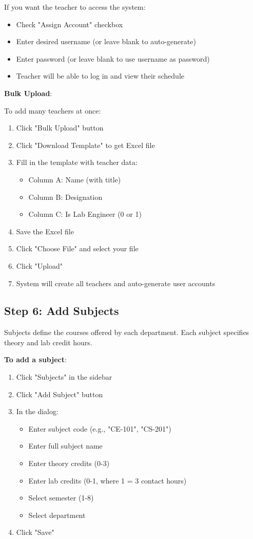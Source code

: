 \documentclass[12pt,a4paper]{article}
\begin{document}
If you want the teacher to access the system:
\begin{itemize}
\item Check "Assign Account" checkbox
\item Enter desired username (or leave blank to auto-generate)
\item Enter password (or leave blank to use username as password)
\item Teacher will be able to log in and view their schedule
\end{itemize}

\textbf{Bulk Upload}:

To add many teachers at once:
\begin{enumerate}
\item Click "Bulk Upload" button
\item Click "Download Template" to get Excel file
\item Fill in the template with teacher data:
\begin{itemize}
\item Column A: Name (with title)
\item Column B: Designation
\item Column C: Is Lab Engineer (0 or 1)
\end{itemize}
\item Save the Excel file
\item Click "Choose File" and select your file
\item Click "Upload"
\item System will create all teachers and auto-generate user accounts
\end{enumerate}


\subsection{Step 6: Add Subjects}

Subjects define the courses offered by each department. Each subject specifies theory and lab credit hours.

\textbf{To add a subject}:
\begin{enumerate}
\item Click "Subjects" in the sidebar
\item Click "Add Subject" button
\item In the dialog:
\begin{itemize}
\item Enter subject code (e.g., "CE-101", "CS-201")
\item Enter full subject name
\item Enter theory credits (0-3)
\item Enter lab credits (0-1, where 1 = 3 contact hours)
\item Select semester (1-8)
\item Select department
\end{itemize}
\item Click "Save"
\end{enumerate}
\end{document}
